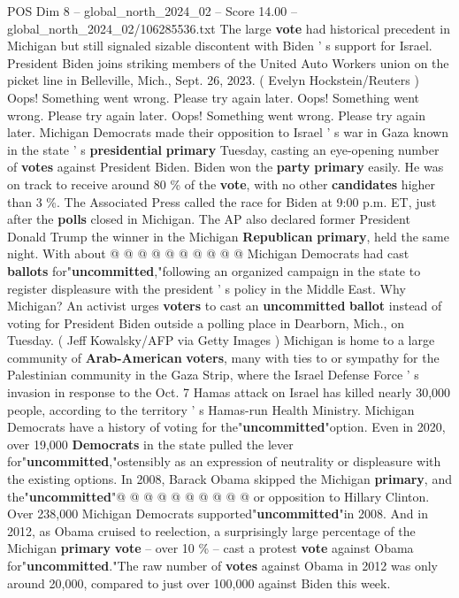 \begin{textsample}{POS Dim 8 – global\_north\_2024\_02 – Score 14.00 – global\_north\_2024\_02/106285536.txt}  \label{ex:f8_pos_029}
The large \textbf{vote} had historical precedent in Michigan but still signaled sizable discontent with Biden ' s support for Israel.
President Biden joins striking members of the United Auto Workers union on the picket line in Belleville, Mich., Sept. 26, 2023. ( Evelyn Hockstein/Reuters ) Oops!
Something went wrong.
Please try again later.
Oops!
Something went wrong.
Please try again later.
Oops!
Something went wrong.
Please try again later.
Michigan Democrats made their opposition to Israel ' s war in Gaza known in the state ' s \textbf{presidential} \textbf{primary} Tuesday, casting an eye-opening number of \textbf{votes} against President Biden.
Biden won the \textbf{party} \textbf{primary} easily.
He was on track to receive around 80 \% of the \textbf{vote}, with no other \textbf{candidates} higher than 3 \%.
The Associated Press called the race for Biden at 9:00 p.m.
ET, just after the \textbf{polls} closed in Michigan.
The AP also declared former President Donald Trump the winner in the Michigan \textbf{Republican} \textbf{primary}, held the same night.
With about @ @ @ @ @ @ @ @ @ @ Michigan Democrats had cast \textbf{ballots} for"\textbf{uncommitted},"following an organized campaign in the state to register displeasure with the president ' s policy in the Middle East.
Why Michigan?
An activist urges \textbf{voters} to cast an \textbf{uncommitted} \textbf{ballot} instead of voting for President Biden outside a polling place in Dearborn, Mich., on Tuesday. ( Jeff Kowalsky/AFP via Getty Images ) Michigan is home to a large community of \textbf{Arab-American} \textbf{voters}, many with ties to or sympathy for the Palestinian community in the Gaza Strip, where the Israel Defense Force ' s invasion in response to the Oct. 7 Hamas attack on Israel has killed nearly 30,000 people, according to the territory ' s Hamas-run Health Ministry.
Michigan Democrats have a history of voting for the"\textbf{uncommitted}"option.
Even in 2020, over 19,000 \textbf{Democrats} in the state pulled the lever for"\textbf{uncommitted},"ostensibly as an expression of neutrality or displeasure with the existing options.
In 2008, Barack Obama skipped the Michigan \textbf{primary}, and the"\textbf{uncommitted}"@ @ @ @ @ @ @ @ @ @ or opposition to Hillary Clinton.
Over 238,000 Michigan Democrats supported"\textbf{uncommitted}"in 2008.
And in 2012, as Obama cruised to reelection, a surprisingly large percentage of the Michigan \textbf{primary} \textbf{vote} -- over 10 \% -- cast a protest \textbf{vote} against Obama for"\textbf{uncommitted}."The raw number of \textbf{votes} against Obama in 2012 was only around 20,000, compared to just over 100,000 against Biden this week.

\end{textsample}
